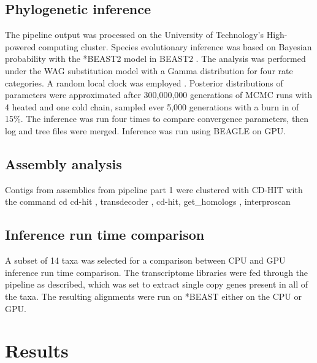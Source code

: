 \documentclass[12pt]{article}
\begin{document}
\subsection*{Phylogenetic inference}
The pipeline output was processed on the University of Technology's High-powered computing cluster.
Species evolutionary inference was based on Bayesian probability with the *BEAST2 model in BEAST2 \cite{bouckaert2014beast}. 
The analysis was performed under the WAG substitution model \cite{whelan2001general} with a Gamma distribution for four rate categories. 
A random local clock was employed \cite{drummond2010bayesian}. 
Posterior distributions of parameters were approximated after 300,000,000 generations of MCMC runs with 4 heated and one cold chain, sampled ever 5,000 generations  with a burn in of 15\%. 
The inference was run four times to compare convergence parameters, then log and tree files were merged. 
Inference was run using BEAGLE \cite{ayres2011beagle} on GPU.

\subsection*{Assembly analysis}
Contigs from assemblies from pipeline part 1 were clustered with CD-HIT with the command cd %
cd-hit \cite{fu2012cd}, transdecoder \cite{haas2016transdecoder}, cd-hit, get\_homologs \cite{contreras2013gethom}, interproscan \cite{quevillon2005interproscan}
\subsection*{Inference run time comparison}
A subset of 14 taxa was selected for a comparison between CPU and GPU inference run time comparison. 
The transcriptome libraries were fed through the pipeline as described, which was set to extract single copy genes present in all of the taxa. 
The resulting alignments were run on *BEAST either on the CPU or GPU.

\newpage
\section{Results}
\end{document}
